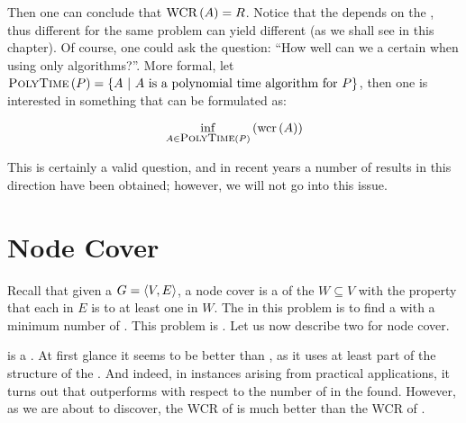 Then one can conclude that $\mbox{WCR}\left( A \right)=R$. Notice that the  depends on the , thus different  for the same problem can yield different  (as we shall see in this chapter). Of course, one could ask the question: ``How well can we  a certain  when using only  algorithms?''. More formal, let $\mbox{\textsc{PolyTime}}\left( P \right)=\left\{ A\ |\ \mbox{$A$ is a polynomial time algorithm for $P$} \right\}$, then one is interested in something that can be formulated as:

\begin{equation}
\inf_{A\in\mbox{\textsc{\small{PolyTime}}}\left( P \right)}\left( \mbox{wcr}\left( A \right) \right)
\end{equation}

This is certainly a valid question, and in recent years a number of results in this direction have been obtained; however, we will not go into this issue.

\section{Node Cover}

Recall that given a  $G=\left\langle V,E \right\rangle$, a node cover is a  of the  $W\subseteq V$ with the property that each  in $E$ is  to at least one  in $W$. The  in this problem is to find a  with a minimum number of . This problem is . Let us now describe two  for node cover.


 is a . At first glance it seems to be better than , as it uses at least part of the structure of the . And indeed, in instances arising from practical applications, it turns out that  outperforms  with respect to the number of  in the  found. However, as we are about to discover, the WCR of  is much better than the WCR of .

